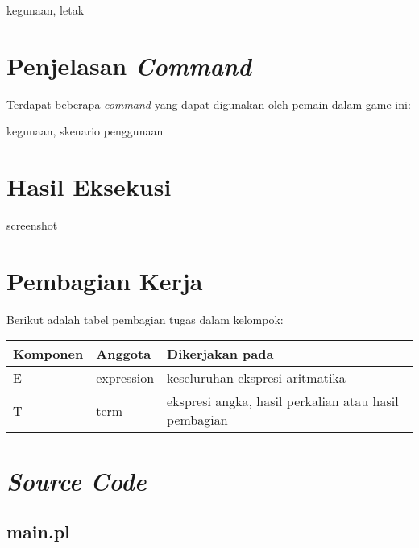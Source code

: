 \documentclass[a4paper,titlepage]{article}
\begin{document}
		kegunaan, letak


	\section{Penjelasan \textit{Command}}

		\noindent Terdapat beberapa \textit{command} yang dapat digunakan oleh pemain dalam game ini:

		kegunaan, skenario penggunaan

	\section{Hasil Eksekusi}

		screenshot


	\section{Pembagian Kerja}

		\noindent Berikut adalah tabel pembagian tugas dalam kelompok:

		\begin{table}[H]
			\centering
			\begin{tabular}{@{}lll@{}}
				\toprule
				Komponen & Anggota & Dikerjakan pada \\ \midrule
				E & expression 			& keseluruhan ekspresi aritmatika \\
				T & term 				& ekspresi angka, hasil perkalian atau hasil pembagian \\

			\end{tabular}
		\end{table}

	\section{\textit{Source Code}}

		\subsection{main.pl}
			
\end{document}
